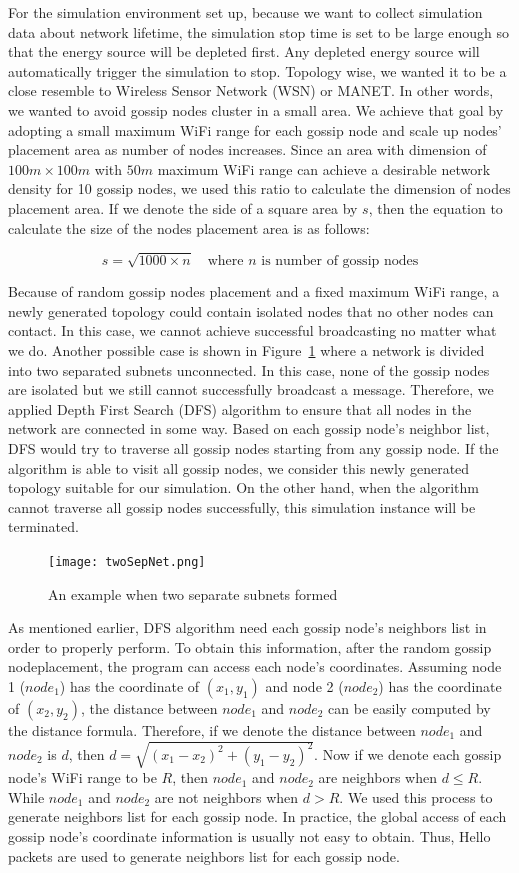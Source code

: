 \documentclass[onehalf,11pt]{beavtex}
\newcommand{\msg}{message}
\newcommand{\gn}{gossip node}
\begin{document}
For the simulation environment set up, because we want to collect simulation data about network lifetime, the simulation stop time is set to be large enough so that the energy source will be depleted first. Any depleted energy source will automatically trigger the simulation to stop. Topology wise, we wanted it to be a close resemble to Wireless Sensor Network (WSN) or MANET. In other words, we wanted to avoid gossip nodes cluster in a small area. We achieve that goal by adopting a small maximum WiFi range for each gossip node and scale up nodes' placement area as number of nodes increases. Since an area with dimension of $100m \times 100m$ with $50m$ maximum WiFi range can achieve a desirable network density for 10 gossip nodes, we used this ratio to calculate the dimension of nodes placement area. If we denote the side of a square area by $s$, then the equation to calculate the size of the nodes placement area is as follows:

\[ s=\sqrt{1000\times n} \quad \mbox{where } n \mbox{ is number of gossip nodes}\]

Because of random gossip nodes placement and a fixed maximum WiFi range, a newly generated topology could contain isolated nodes that no other nodes can contact. In this case, we cannot achieve successful broadcasting no matter what we do. Another possible case is shown in Figure~\ref{fig:twoSepNet} where a network is divided into two separated subnets unconnected. In this case, none of the gossip nodes are isolated but we still cannot successfully broadcast a \msg. Therefore, we applied Depth First Search (DFS) algorithm to ensure that all nodes in the network are connected in some way. Based on each gossip node's neighbor list, DFS would try to traverse all gossip nodes starting from any gossip node. If the algorithm is able to visit all gossip nodes, we consider this newly generated topology suitable for our simulation. On the other hand, when the algorithm cannot traverse all gossip nodes successfully, this simulation instance will be terminated.

\begin{figure}
	\centering
	\texttt{[image: twoSepNet.png]}
	\caption{An example when two separate subnets formed}
	\label{fig:twoSepNet}
\end{figure}

As mentioned earlier, DFS algorithm need each \gn's neighbors list in order to properly perform. To obtain this information, after the random \gn placement, the program can access each node's coordinates. Assuming node 1 ($node_1$) has the coordinate of $(x_1, y_1)$ and node 2 ($node_2$) has the coordinate of $(x_2, y_2)$, the distance between $node_1$ and $node_2$ can be easily computed by the distance formula. Therefore, if we denote the distance between $node_1$ and $node_2$ is $d$, then $d = \sqrt{(x_1 - x_2)^2+(y_1 - y_2)^2}$. Now if we denote each \gn's WiFi range to be $R$, then $node_1$ and $node_2$ are neighbors when $d\leq R$. While $node_1$ and $node_2$ are not neighbors when $d > R$. We used this process to generate neighbors list for each \gn. In practice, the global access of each \gn's coordinate information is usually not easy to obtain. Thus, Hello packets are used to generate neighbors list for each \gn.
\end{document}
